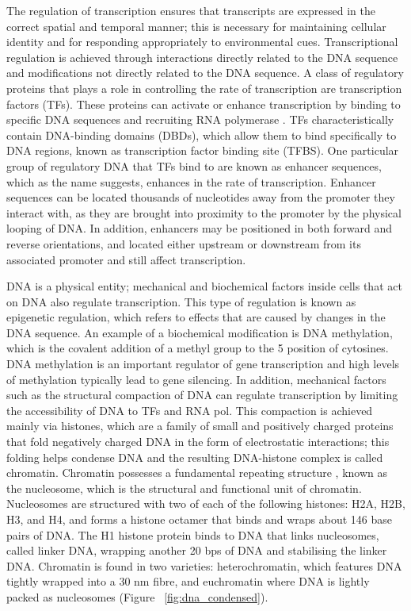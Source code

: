 The regulation of transcription ensures that transcripts are expressed in the correct spatial and temporal manner; this is necessary for maintaining cellular identity and for responding appropriately to environmental cues. Transcriptional regulation is achieved through interactions directly related to the DNA sequence and modifications not directly related to the DNA sequence. A class of regulatory proteins that plays a role in controlling the rate of transcription are transcription factors (TFs). These proteins can activate or enhance transcription by binding to specific DNA sequences and recruiting RNA polymerase \citep{pmid11092823}. TFs characteristically contain DNA-binding domains (DBDs), which allow them to bind specifically to DNA regions, known as transcription factor binding site (TFBS). One particular group of regulatory DNA that TFs bind to are known as enhancer sequences, which as the name suggests, enhances in the rate of transcription. Enhancer sequences can be located thousands of nucleotides away from the promoter they interact with, as they are brought into proximity to the promoter by the physical looping of DNA. In addition, enhancers may be positioned in both forward and reverse orientations, and located either upstream or downstream from its associated promoter and still affect transcription.

DNA is a physical entity; mechanical and biochemical factors inside cells that act on DNA also regulate transcription. This type of regulation is known as epigenetic regulation, which refers to effects that are caused by changes in the DNA sequence. An example of a biochemical modification is DNA methylation, which is the covalent addition of a methyl group to the 5 position of cytosines. DNA methylation is an important regulator of gene transcription and high levels of methylation typically lead to gene silencing. In addition, mechanical factors such as the structural compaction of DNA can regulate transcription by limiting the accessibility of DNA to TFs and RNA pol. This compaction is achieved mainly via histones, which are a family of small and positively charged proteins that fold negatively charged DNA in the form of electrostatic interactions; this folding helps condense DNA and the resulting DNA-histone complex is called chromatin. Chromatin possesses a fundamental repeating structure \citep{holde01111974}, known as the nucleosome, which is the structural and functional unit of chromatin. Nucleosomes are structured with two of each of the following histones: H2A, H2B, H3, and H4, and forms a histone octamer that binds and wraps about 146 base pairs of DNA. The H1 histone protein binds to DNA that links nucleosomes, called linker DNA, wrapping another 20 bps of DNA and stabilising the linker DNA. Chromatin is found in two varieties: heterochromatin, which features DNA tightly wrapped into a 30 nm fibre, and euchromatin where DNA is lightly packed as nucleosomes (Figure ~\ref{fig:dna_condensed}).

